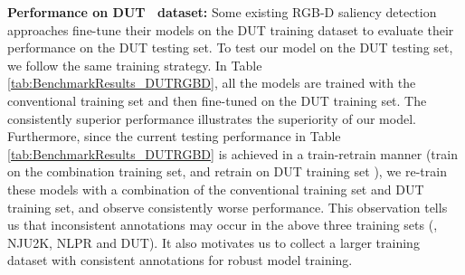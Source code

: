 \documentclass[10pt,twocolumn,letterpaper]{article}
\begin{document}
\noindent\textbf{Performance on DUT~\cite{dmra_iccv19} dataset:} Some existing RGB-D saliency detection approaches \cite{dmra_iccv19,self_attention_rgbd} fine-tune their models on the DUT training dataset \cite{dmra_iccv19} to evaluate their performance on the DUT testing set. To test our model on the DUT testing set, we follow the same training strategy.
In Table \ref{tab:BenchmarkResults_DUTRGBD}, all the models are trained with the conventional training set and then fine-tuned on the DUT training set. 
The consistently superior performance illustrates the superiority of our model.
Furthermore, since the current testing performance in Table \ref{tab:BenchmarkResults_DUTRGBD} is achieved in a train-retrain manner (train on the combination training set, and retrain on DUT training set \cite{dmra_iccv19}), we re-train these models with a combination of the conventional training set and DUT training set, and observe consistently worse performance. This observation tells us that inconsistent annotations may occur in the
above three training sets (\ie, NJU2K, NLPR and DUT). It also motivates us to collect a larger training dataset with consistent annotations for robust model training.
\end{document}

